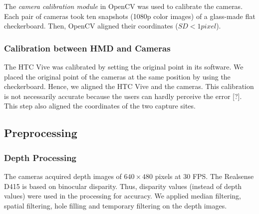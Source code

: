 The \emph{camera calibration module} in OpenCV was used to calibrate the cameras. Each pair of cameras took ten snapshots (1080p color images) of a glass-made flat checkerboard. Then, OpenCV aligned their coordinates ($SD < 1 pixel$).


\subsubsection{Calibration between HMD and Cameras}

The HTC Vive was calibrated by setting the original point in its software. We placed the original point of the cameras at the same position by using the checkerboard. Hence, we aligned the HTC Vive and the cameras. This calibration is not necessarily accurate because the users can hardly perceive the error [?]. This step also aligned the coordinates of the two capture sites.


\subsection{Preprocessing}

\subsubsection{Depth Processing}

The cameras acquired depth images of $640 \times 480$ pixels at 30 FPS. The Realsense D415 is based on binocular disparity. Thus, disparity values (instead of depth values) were used in the processing for accuracy. We applied median filtering, spatial filtering, hole filling and temporary filtering on the depth images.

